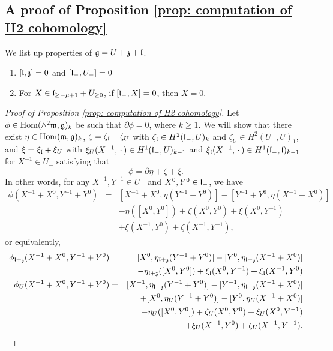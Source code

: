\documentclass[12pt]{amsart}
\theoremstyle{plain}
\theoremstyle{definition}
\def\Hom{\operatorname{Hom}}
\begin{document}
\subsection{A proof of Proposition \ref{prop: computation of H2 cohomology}}   \label{sect: proof of proposition}
%
We list up properties of $\frak g = U + \frak z + \frak l$.

\begin{enumerate}
\item [(${\bf P_0}$)] $[\frak l, \frak z]=0$ and $[\frak l_-, U_-]=0$
\item [(${\bf P_1}$)] For $X \in \frak l_{\geq - \mu+1} +U_{\geq 0} $, if $[\frak l_-, X]=0$, then $X=0$. \\
\end{enumerate}

\begin{proof} [Proof of Proposition \ref{prop: computation of H2 cohomology}]
 Let $\phi \in \Hom(\wedge^2 \frak m, \frak g)_k$ be such that $\partial \phi=0$, where $k \geq 1$. We will show that there exist   $\eta \in \Hom(\frak m, \frak g)_k$, $\zeta=\zeta_{\frak l}+\zeta_U$ with $\zeta_{\frak l} \in  H^2(\frak l_-, U)_k$ and $\zeta_U \in H^2(U_-, U)_1$, and $\xi=\xi_{\frak l} + \xi_U $ with $\xi_U(X^{-1}, \,\cdot\,) \in H^1(\frak l_-, U)_{k-1}$ and $\xi_{\frak l}(X^{-1}, \,\cdot\,) \in H^1(\frak l_-, \frak l)_{k-1}$ for $X^{-1} \in U_-$ satisfying that  $$\phi = \partial \eta + \zeta +\xi .$$ In other words, for any $X^{-1}, Y^{-1} \in U_-$ and $X^0, Y^0 \in \frak l_-$, we have
 \begin{eqnarray*}
 \phi(X^{-1} + X^{0}, Y^{-1}+ Y^0)   &=&  [X^{-1}+X^0, \eta(Y^{-1}+ Y^0)] -[Y^{-1}+Y^0, \eta(X^{-1} + X^0)]\\
 &&- \eta([X^0, Y^0])  + \zeta(X^0, Y^0) +\xi(X^0, Y^{-1})\\ && + \xi(X^{-1}, Y^0) + \zeta(X^{-1}, Y^{-1}),
 \end{eqnarray*}
 or equivalently,
 \begin{eqnarray*}
 \phi_{\frak l+\frak z}(X^{-1} + X^0, Y^{-1}+Y^0)
   &=& [X^0, \eta_{\frak l+\frak z}(Y^{-1} +Y^0)] - [Y^0, \eta_{\frak l+\frak z}(X^{-1} + X^0)] \\
  &&- \eta_{\frak l+\frak z}([X^0, Y^0])+\xi_{\frak l}(X^0, Y^{-1}) + \xi_{\frak l}(X^{-1}, Y^0) \\
   \phi_U(X^{-1}+X^0, Y^{-1}+Y^0)
 &=& [X^{-1}, \eta_{\frak l + \frak z}(Y^{-1} +Y^0)]-[Y^{-1}, \eta_{\frak l + \frak z}(X^{-1}+X^0)] \\
 &&  + [X^0, \eta_U(Y^{-1} + Y^0)] -[Y^0, \eta_U(X^{-1} + X^0)]   \\
 && - \eta_U([X^0, Y^0]) + \zeta_U(X^0, Y^0)+\xi_U(X^0, Y^{-1}) \\ && + \xi_U(X^{-1}, Y^0) + \zeta_U(X^{-1}, Y^{-1}).
 \end{eqnarray*}


\end{proof}
\end{document}
